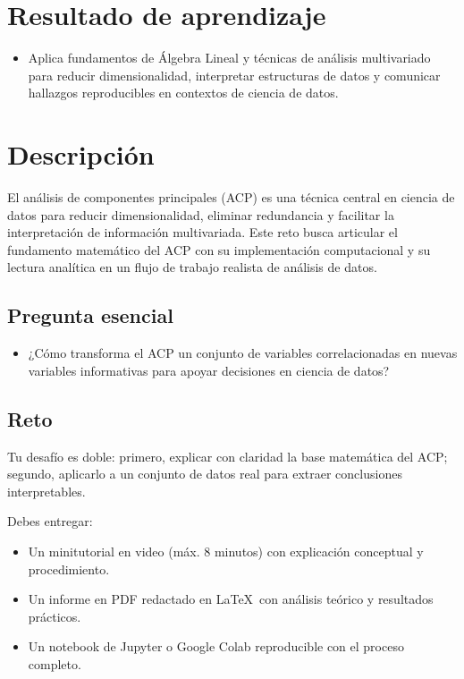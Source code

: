 \documentclass[a4,11pt]{aleph-notas}
\begin{document}
\encabezado

\section{Resultado de aprendizaje}

\begin{itemize}
\item 
    Aplica fundamentos de Álgebra Lineal y técnicas de análisis multivariado para reducir dimensionalidad, interpretar estructuras de datos y comunicar hallazgos reproducibles en contextos de ciencia de datos.
\end{itemize}


\section{Descripción}

El análisis de componentes principales (ACP) es una técnica central en ciencia de datos para reducir dimensionalidad, eliminar redundancia y facilitar la interpretación de información multivariada. Este reto busca articular el fundamento matemático del ACP con su implementación computacional y su lectura analítica en un flujo de trabajo realista de análisis de datos.

\subsection*{Pregunta esencial}
\begin{itemize}[leftmargin=*]
\item ¿Cómo transforma el ACP un conjunto de variables correlacionadas en nuevas variables informativas para apoyar decisiones en ciencia de datos?
\end{itemize}

\subsection*{Reto}

Tu desafío es doble: primero, explicar con claridad la base matemática del ACP; segundo, aplicarlo a un conjunto de datos real para extraer conclusiones interpretables.

Debes entregar:
\begin{itemize}[leftmargin=*]
\item Un minitutorial en video (máx. 8 minutos) con explicación conceptual y procedimiento.
\item Un informe en PDF redactado en \LaTeX\ con análisis teórico y resultados prácticos.
\item Un notebook de Jupyter o Google Colab reproducible con el proceso completo.
\end{itemize}
\end{document}
